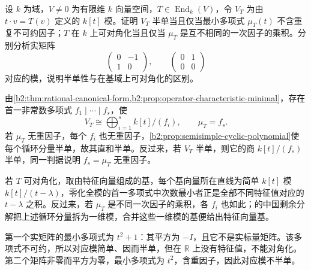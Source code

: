 \begin{exercise}\label{b2:ex:13-squarefree-cyclic}
	设 \(k\) 为域，\(V\ne0\) 为有限维 \(k\) 向量空间，\(T\in\operatorname{End}_k(V)\)，令 \(V_T\) 为由 \(t\cdot v=T(v)\) 定义的 \(k[t]\) 模。证明 \(V_T\) 半单当且仅当最小多项式 \(\mu_T(t)\) 不含重复不可约因子；\(T\) 在 \(k\) 上可对角化当且仅当 \(\mu_T\) 是互不相同的一次因子的乘积。分别分析实矩阵
	\[
		\begin{pmatrix}0&-1\\1&0\end{pmatrix},\qquad
		\begin{pmatrix}0&1\\0&0\end{pmatrix}
	\]
	对应的模，说明半单性与在基域上可对角化的区别。
\end{exercise}
\begin{solution}
	由\cref{b2:thm:rational-canonical-form,b2:prop:operator-characteristic-minimal}，存在首一非常数多项式 \(f_1\mid\cdots\mid f_s\)，使
	\[
		V_T\cong\bigoplus_{i=1}^s k[t]/(f_i),\qquad \mu_T=f_s.
	\]
	若 \(\mu_T\) 无重因子，每个 \(f_i\) 也无重因子，\cref{b2:prop:semisimple-cyclic-polynomial}使每个循环分量半单，故其直和半单。反过来，若 \(V_T\) 半单，则它的商 \(k[t]/(f_s)\) 半单，同一判据说明 \(f_s=\mu_T\) 无重因子。

	若 \(T\) 可对角化，取由特征向量组成的基，每个基向量所在直线为简单 \(k[t]\) 模 \(k[t]/(t-\lambda)\)，零化全模的首一多项式中次数最小者正是全部不同特征值对应的 \(t-\lambda\) 之积。反过来，若 \(\mu_T\) 是不同一次因子的乘积，各 \(f_i\) 也如此；的中国剩余分解把上述循环分量拆为一维模，合并这些一维模的基便给出特征向量基。

	第一个实矩阵的最小多项式为 \(t^2+1\)：其平方为 \(-I\)，且它不是实标量矩阵。该多项式不可约，所以对应模简单、因而半单，但在 \(\mathbb R\) 上没有特征值，不能对角化。第二个矩阵非零而平方为零，最小多项式为 \(t^2\)，含重因子，因此对应模不半单。
\end{solution}

